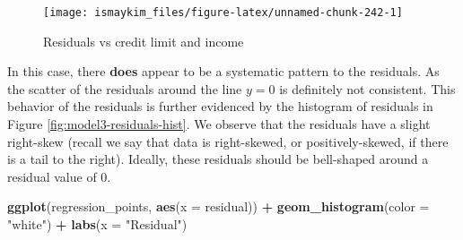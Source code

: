 \documentclass[12pt,]{krantz}
\makeatletter
\newenvironment{Shaded}{\begin{snugshade}}{\end{snugshade}}
\newcommand{\KeywordTok}[1]{\textcolor[rgb]{0.27,0.27,0.27}{\textbf{#1}}}
\newcommand{\DataTypeTok}[1]{\textcolor[rgb]{0.27,0.27,0.27}{#1}}
\newcommand{\StringTok}[1]{\textcolor[rgb]{0.5,0.5,0.5}{#1}}
\newcommand{\OperatorTok}[1]{\textcolor[rgb]{0.43,0.43,0.43}{\textbf{#1}}}
\newcommand{\NormalTok}[1]{#1}
\newenvironment{kframe}{%
\medskip{}
\setlength{\fboxsep}{.8em}
 \def\at@end@of@kframe{}%
 \ifinner\ifhmode%
  \def\at@end@of@kframe{\end{minipage}}%
  \begin{minipage}{\columnwidth}%
 \fi\fi%
 \def\FrameCommand##1{\hskip\@totalleftmargin \hskip-\fboxsep
 \colorbox{shadecolor}{##1}\hskip-\fboxsep
     \hskip-\linewidth \hskip-\@totalleftmargin \hskip\columnwidth}%
 \MakeFramed {\advance\hsize-\width
   \@totalleftmargin\z@ \linewidth\hsize
   \@setminipage}}%
 {\par\unskip\endMakeFramed%
 \at@end@of@kframe}
\renewenvironment{Shaded}{\begin{kframe}}{\end{kframe}}
\makeatother
\begin{document}
\begin{Shaded}
\end{Shaded}

\begin{figure}

{\centering \texttt{[image: ismaykim\_files/figure-latex/unnamed-chunk-242-1]} 

}

\caption{Residuals vs credit limit and income}\label{fig:unnamed-chunk-242}
\end{figure}

In this case, there \textbf{does} appear to be a systematic pattern to
the residuals. As the scatter of the residuals around the line \(y=0\)
is definitely not consistent. This behavior of the residuals is further
evidenced by the histogram of residuals in Figure
\ref{fig:model3-residuals-hist}. We observe that the residuals have a
slight right-skew (recall we say that data is right-skewed, or
positively-skewed, if there is a tail to the right). Ideally, these
residuals should be bell-shaped around a residual value of 0.

\begin{Shaded}
\begin{Highlighting}[]
\KeywordTok{ggplot}\NormalTok{(regression_points, }\KeywordTok{aes}\NormalTok{(}\DataTypeTok{x =}\NormalTok{ residual)) }\OperatorTok{+}
\StringTok{  }\KeywordTok{geom_histogram}\NormalTok{(}\DataTypeTok{color =} \StringTok{"white"}\NormalTok{) }\OperatorTok{+}
\StringTok{  }\KeywordTok{labs}\NormalTok{(}\DataTypeTok{x =} \StringTok{"Residual"}\NormalTok{)}
\end{Highlighting}
\end{Shaded}
\end{document}
